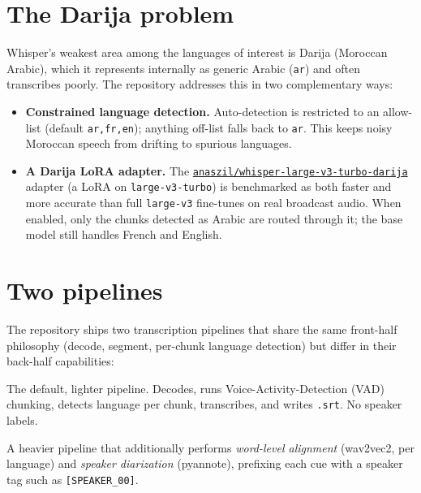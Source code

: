 \documentclass[11pt,a4paper]{report}
\newcommand{\code}[1]{\texttt{\small #1}}
\begin{document}
\section{The Darija problem}

Whisper's weakest area among the languages of interest is Darija (Moroccan
Arabic), which it represents internally as generic Arabic (\code{ar}) and often
transcribes poorly. The repository addresses this in two complementary ways:

\begin{itemize}[leftmargin=1.4em]
  \item \textbf{Constrained language detection.} Auto-detection is restricted to
        an allow-list (default \code{ar,fr,en}); anything off-list falls back to
        \code{ar}. This keeps noisy Moroccan speech from drifting to spurious
        languages.
  \item \textbf{A Darija LoRA adapter.} The
        \href{https://huggingface.co/anaszil/whisper-large-v3-turbo-darija}{\code{anaszil/whisper-large-v3-turbo-darija}}
        adapter (a LoRA on \code{large-v3-turbo}) is benchmarked as both faster and
        more accurate than full \code{large-v3} fine-tunes on real broadcast audio.
        When enabled, only the chunks detected as Arabic are routed through it; the
        base model still handles French and English.
\end{itemize}

\section{Two pipelines}

The repository ships two transcription pipelines that share the same front-half
philosophy (decode, segment, per-chunk language detection) but differ in their
back-half capabilities:

\begin{description}[leftmargin=2em,style=nextline]
  \item[\texttt{src/transcribe.py} (faster-whisper)] The default, lighter
        pipeline. Decodes, runs Voice-Activity-Detection (VAD) chunking, detects
        language per chunk, transcribes, and writes \texttt{.srt}. No speaker
        labels.
  \item[\texttt{src/transcribe\_whisperx.py} (WhisperX)] A heavier pipeline that
        additionally performs \emph{word-level alignment} (wav2vec2, per language)
        and \emph{speaker diarization} (pyannote), prefixing each cue with a
        speaker tag such as \code{[SPEAKER\_00]}.
\end{description}
\end{document}
